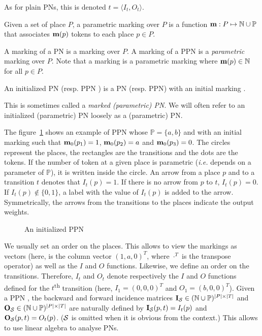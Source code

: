 As for plain \acp{PN}, this is denoted $t = \langle I_t, O_t \rangle$.

\begin{defi}
  Given a set of place $P$, a parametric marking over $P$ is a function $\mathbf{m} : P \mapsto \mathbb{N} \cup \mathbb{P} $ that associates $\mathbf{m}(p)$ tokens to each place $p \in P$.
\end{defi}

A marking of a \ac{PN} \NPT is a marking over $P$.
A marking of a \ac{PPN} \SPTP is a \emph{parametric} marking over $P$.
Note that a marking \marq is a parametric marking where $\mathbf{m}(p) \in \mathbb{N}$ for all $p \in P$.

\begin{defi}
  An initialized \ac{PN} \NPTm (resp. \ac{PPN} \SPTPm) is a \ac{PN} (resp. \ac{PPN}) with an initial marking \marqi.
\end{defi}

This is sometimes called a \emph{marked (parametric) \ac{PN}}.
We will often refer to an initialized (parametric) \ac{PN} loosely as a (parametric) \ac{PN}.

The figure~\ref{fig:parametric-petri-net-example} shows an example of \ac{PPN} whose $\mathbb{P} = \{a, b\}$ and with an initial marking \marqi such that $\mathbf{m}_0(p_1) = 1$, $\mathbf{m}_0(p_2) = a$ and $\mathbf{m}_0(p_3) = 0$. The circles represent the places, the rectangles are the transitions and the dots are the tokens. If the number of token at a given place is parametric (\textit{i.e.} depends on a parameter of $\mathbb{P}$), it is written inside the circle. An arrow from a place $p$ and to a transition $t$ denotes that $I_t(p) = 1$. If there is no arrow from $p$ to $t$, $I_t(p) = 0$. If $I_t(p) \notin \{0, 1\}$, a label with the value of $I_t(p)$ is added to the arrow.
Symmetrically, the arrows from the transitions to the places indicate the output weights.

\begin{figure}[h]
  \centering
  
  \par
  \caption{An initialized \ac{PPN}}
  \label{fig:parametric-petri-net-example}
\end{figure}

We usually set an order on the places.
This allows to view the markings as vectors (here, \marqi is the column vector $(1, a, 0)^T$, where $\cdot^T$ is the transpose operator) as well as the $I$ and $O$ functions.
Likewise, we define an order on the transitions.
Therefore, $I_t$ and $O_t$ denote respectively the $I$ and $O$ functions defined for the $t$\textsuperscript{th} transition (here, $I_1 = (0, 0, 0)^T$ and $O_1 = (b, 0, 0)^T$).
Given a \ac{PPN} \SPTP, the backward and forward incidence matrices $\mathbf{I}_\mathcal{S} \in (\mathbb{N} \cup \mathbb{P})^{|P|\times|T|}$ and $\mathbf{O}_\mathcal{S} \in (\mathbb{N} \cup \mathbb{P})^{|P|\times|T|}$ are naturally defined by $\mathbf{I}_\mathcal{S}(p, t) = I_t(p)$ and $\mathbf{O}_\mathcal{S}(p, t) = O_t(p)$.
($\mathcal{S}$ is omitted when it is obvious from the context.)
This allows to use linear algebra to analyse \acp{PN}.

